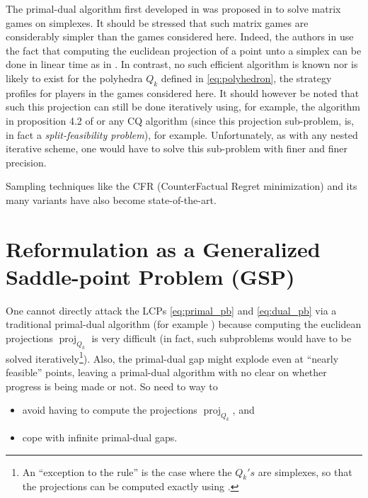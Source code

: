 \documentclass{article} %
\DeclareMathOperator{\proj}{proj}
\begin{document}


The primal-dual algorithm first developed in \cite{chambolle2010} was
proposed \cite{chambolle2014ergodic} in to solve matrix games on
simplexes. It should be stressed that such matrix games are
considerably simpler than the games considered here. Indeed, the
authors in \cite{chambolle2014ergodic} use the fact that computing the
euclidean projection of a point unto a simplex can be done in linear
time as in \cite{duchi2008efficient}. In contrast, no such efficient
algorithm is known nor is likely to exist for the polyhedra $Q_k$
defined in \eqref{eq:polyhedron}, the strategy profiles for players in
the games considered here. It should however be noted that such this
projection can still be done iteratively using, for example, the
algorithm in proposition 4.2 of \cite{combettes2010dualization} or any
CQ algorithm (since this projection sub-problem, is, in fact a
\textit{split-feasibility problem}), for example. Unfortunately, as
with any nested iterative scheme, one would have to solve this
sub-problem with finer and finer precision.


Sampling techniques like the CFR (CounterFactual Regret minimization)
and its many variants
\cite{MartinZinkevichNIPS2007,lanctot2009monte,Bowling09012015} have
also become state-of-the-art.


\section{Reformulation as a Generalized Saddle-point Problem (GSP)}
\label{sec:gsp}
One cannot directly attack the LCPs \eqref{eq:primal_pb} and
\eqref{eq:dual_pb} via a traditional primal-dual algorithm
(for example \cite{chambolle2010,chambolle2014ergodic}) because
computing the euclidean projections $\proj_{Q_k}$ is very difficult
(in fact, such subproblems would have to be solved
iteratively\footnote{An ``exception to the rule'' is the case where
  the $Q_k's$ are simplexes, so that the projections can be computed
  exactly using \cite{duchi2008efficient}.}). Also,
the primal-dual gap might explode even at ``nearly feasible'' points,
leaving a primal-dual algorithm with no clear on whether progress is
being made or not. So need to way to
\begin{itemize}
\item avoid having to compute the projections $\proj_{Q_k}$, and
\item cope  with infinite primal-dual gaps.
\end{itemize}
\end{document}
